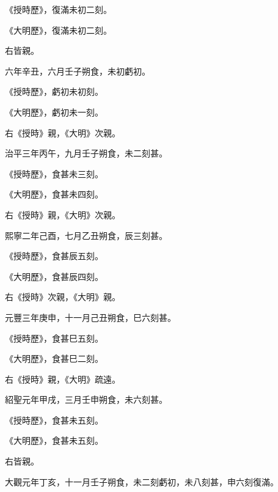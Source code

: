 \begin{pinyinscope}
 《授時歷》，復滿未初二刻。



 《大明歷》，復滿未初二刻。



 右皆親。



 六年辛丑，六月壬子朔食，未初虧初。



 《授時歷》，虧初未初刻。



 《大明歷》，虧初未一刻。



 右《授時》親，《大明》次親。



 治平三年丙午，九月壬子朔食，未二刻甚。



 《授時歷》，食甚未三刻。



 《大明歷》，食甚未四刻。



 右《授時》親，《大明》次親。



 熙寧二年己酉，七月乙丑朔食，辰三刻甚。



 《授時歷》，食甚辰五刻。



 《大明歷》，食甚辰四刻。



 右《授時》次親，《大明》親。



 元豐三年庚申，十一月己丑朔食，巳六刻甚。



 《授時歷》，食甚巳五刻。



 《大明歷》，食甚巳二刻。



 右《授時》親，《大明》疏遠。



 紹聖元年甲戌，三月壬申朔食，未六刻甚。



 《授時歷》，食甚未五刻。



 《大明歷》，食甚未五刻。



 右皆親。



 大觀元年丁亥，十一月壬子朔食，未二刻虧初，未八刻甚，申六刻復滿。




\end{pinyinscope}
